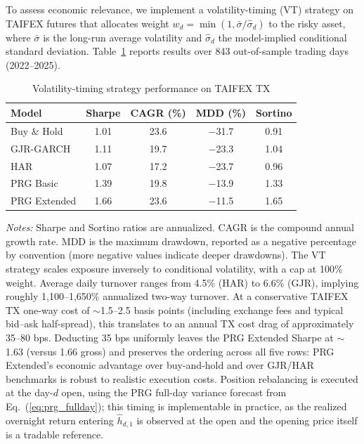 \documentclass[11pt,a4paper]{article}
\begin{document}
To assess economic relevance, we implement a volatility-timing (VT) strategy on TAIFEX futures that allocates weight $w_d = \min(1, \bar{\sigma}/\hat{\sigma}_d)$ to the risky asset, where $\bar{\sigma}$ is the long-run average volatility and $\hat{\sigma}_d$ the model-implied conditional standard deviation. Table~\ref{tab:economic} reports results over 843 out-of-sample trading days (2022--2025).

\begin{table}[htbp]
\centering
\caption{Volatility-timing strategy performance on TAIFEX TX}
\label{tab:economic}
\small
\begin{tabular}{lcccc}
\toprule
Model & Sharpe & CAGR (\%) & MDD (\%) & Sortino \\
\midrule
Buy \& Hold     & 1.01 & 23.6 & $-$31.7 & 0.91 \\
GJR-GARCH       & 1.11 & 19.7 & $-$23.3 & 1.04 \\
HAR             & 1.07 & 17.2 & $-$23.7 & 0.96 \\
PRG Basic       & 1.39 & 19.8 & $-$13.9 & 1.33 \\
PRG Extended    & 1.66 & 23.6 & $-$11.5 & 1.65 \\
\bottomrule
\end{tabular}
\begin{flushleft}
\footnotesize
\emph{Notes:} Sharpe and Sortino ratios are annualized. CAGR is the compound annual growth rate. MDD is the maximum drawdown, reported as a negative percentage by convention (more negative values indicate deeper drawdowns). The VT strategy scales exposure inversely to conditional volatility, with a cap at 100\% weight. Average daily turnover ranges from 4.5\% (HAR) to 6.6\% (GJR), implying roughly 1{,}100--1{,}650\% annualized two-way turnover. At a conservative TAIFEX TX one-way cost of $\sim$1.5--2.5 basis points (including exchange fees and typical bid--ask half-spread), this translates to an annual TX cost drag of approximately 35--80 bps. Deducting 35 bps uniformly leaves the PRG Extended Sharpe at $\sim$1.63 (versus 1.66 gross) and preserves the ordering across all five rows: PRG Extended's economic advantage over buy-and-hold and over GJR/HAR benchmarks is robust to realistic execution costs. Position rebalancing is executed at the day-$d$ open, using the PRG full-day variance forecast from Eq.~(\ref{eq:prg_fullday}); this timing is implementable in practice, as the realized overnight return entering $\hat{h}_{d,1}$ is observed at the open and the opening price itself is a tradable reference.
\end{flushleft}
\end{table}
\end{document}
